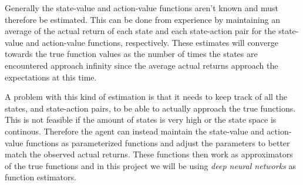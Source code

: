 \documentclass[11pt]{article}
\begin{document}
\maketitle

Generally the state-value and action-value functions aren't known and must therefore be
estimated.
This can be done from experience by maintaining an average of the actual return of each
state and each state-action pair for the state-value and action-value
functions, respectively.
These estimates will converge towards the true function values as the number of times
the states are encountered approach infinity since the average actual returns approach
the expectations at this time.

A problem with this kind of estimation is that it needs to keep track of all the states, and state-action
pairs, to be able to actually approach the true functions.
This is not feasible if the amount of states is very high or the state space is continous.
Therefore the agent can instead maintain the state-value and action-value functions as
parameterized functions and adjust the parameters to better match the observed actual returns\cite{RLbook}.
These functions then work as approximators of the true functions and in this project we will
be using \textit{deep neural networks} as function estimators.
\end{document}
